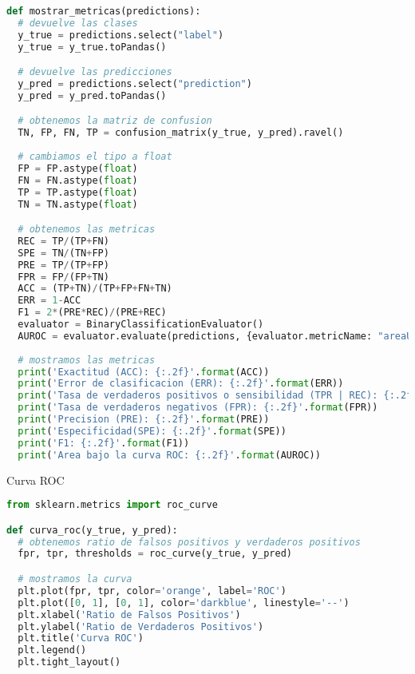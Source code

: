 \begin{itemize}
\begin{minipage}{\linewidth}
\begin{lstlisting}[language=Python, caption=Métricas derivadas de la matriz de confusión]
def mostrar_metricas(predictions):
  # devuelve las clases
  y_true = predictions.select("label")
  y_true = y_true.toPandas()

  # devuelve las predicciones
  y_pred = predictions.select("prediction")
  y_pred = y_pred.toPandas()

  # obtenemos la matriz de confusion
  TN, FP, FN, TP = confusion_matrix(y_true, y_pred).ravel()
  
  # cambiamos el tipo a float
  FP = FP.astype(float)
  FN = FN.astype(float)
  TP = TP.astype(float)
  TN = TN.astype(float)

  # obtenemos las metricas
  REC = TP/(TP+FN)
  SPE = TN/(TN+FP) 
  PRE = TP/(TP+FP)
  FPR = FP/(FP+TN)
  ACC = (TP+TN)/(TP+FP+FN+TN)
  ERR = 1-ACC
  F1 = 2*(PRE*REC)/(PRE+REC)
  evaluator = BinaryClassificationEvaluator()
  AUROC = evaluator.evaluate(predictions, {evaluator.metricName: "areaUnderROC"})
  
  # mostramos las metricas
  print('Exactitud (ACC): {:.2f}'.format(ACC))
  print('Error de clasificacion (ERR): {:.2f}'.format(ERR))
  print('Tasa de verdaderos positivos o sensibilidad (TPR | REC): {:.2f}'.format(REC))
  print('Tasa de verdaderos negativos (FPR): {:.2f}'.format(FPR))
  print('Precision (PRE): {:.2f}'.format(PRE))
  print('Especificidad(SPE): {:.2f}'.format(SPE))
  print('F1: {:.2f}'.format(F1))  
  print('Area bajo la curva ROC: {:.2f}'.format(AUROC))
\end{lstlisting}
\end{minipage}

\begin{minipage}{\linewidth}
    \item Curva ROC

\begin{lstlisting}[language=Python, caption=Curva ROC]
from sklearn.metrics import roc_curve  

def curva_roc(y_true, y_pred):
  # obtenemos ratio de falsos positivos y verdaderos positivos
  fpr, tpr, thresholds = roc_curve(y_true, y_pred)

  # mostramos la curva
  plt.plot(fpr, tpr, color='orange', label='ROC')
  plt.plot([0, 1], [0, 1], color='darkblue', linestyle='--')
  plt.xlabel('Ratio de Falsos Positivos')
  plt.ylabel('Ratio de Verdaderos Positivos')
  plt.title('Curva ROC')
  plt.legend()
  plt.tight_layout()
\end{lstlisting}
\end{minipage}
\end{itemize}
